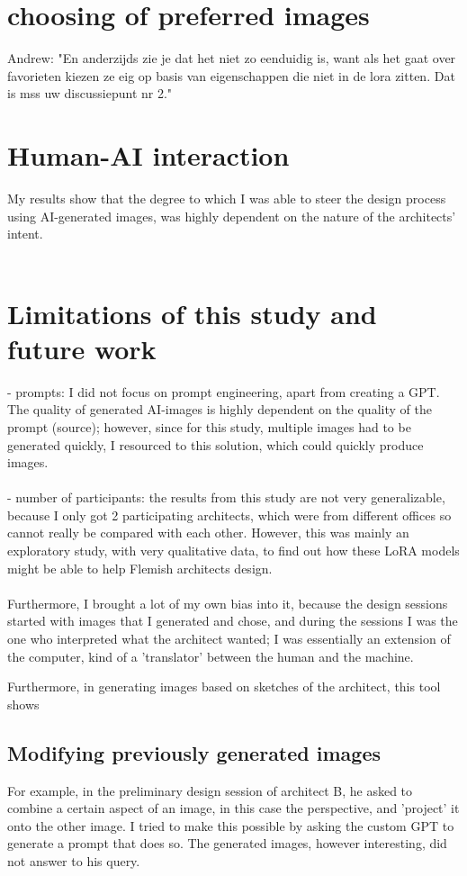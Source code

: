 \section{choosing of preferred images}
Andrew: "En anderzijds zie je dat het niet zo eenduidig is, want als het gaat over favorieten kiezen ze eig op basis van eigenschappen die niet in de lora zitten. Dat is mss uw discussiepunt nr 2."

\section{Human-AI interaction}

My results show that the degree to which I was able to steer the design process using AI-generated images, was highly dependent on the nature of the architects' intent.\\~\\

\section{Limitations of this study and future work}

- prompts: I did not focus on prompt engineering, apart from creating a GPT. The quality of generated AI-images is highly dependent on the quality of the prompt (source); however, since for this study, multiple images had to be generated quickly, I resourced to this solution, which could quickly produce images. \\~\\
- number of participants: the results from this study are not very generalizable, because I only got 2 participating architects, which were from different offices so cannot really be compared with each other. However, this was mainly an exploratory study, with very qualitative data, to find out how these LoRA models might be able to help Flemish architects design. \\~\\

Furthermore, I brought a lot of my own bias into it, because the design sessions started with images that I generated and chose, and during the sessions I was the one who interpreted what the architect wanted; I was essentially an extension of the computer, kind of a 'translator' between the human and the machine.



Furthermore, in generating images based on sketches of the architect, this tool shows

\subsection{Modifying previously generated images}
For example, in the preliminary design session of architect B, he asked to combine a certain aspect of an image, in this case the perspective, and 'project' it onto the other image. I tried to make this possible by asking the custom GPT to generate a prompt that does so. The generated images, however interesting, did not answer to his query. 
